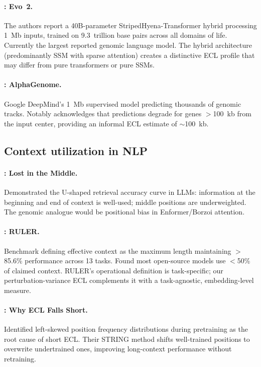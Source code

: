 \paragraph{\citet{Brixi2025Evo2}: Evo~2.}
The authors report a 40B-parameter StripedHyena-Transformer hybrid processing 1~Mb inputs, trained on 9.3~trillion base pairs across all domains of life. Currently the largest reported genomic language model. The hybrid architecture (predominantly SSM with sparse attention) creates a distinctive ECL profile that may differ from pure transformers or pure SSMs.

\paragraph{\citet{Benegas2026AlphaGenome}: AlphaGenome.}
Google DeepMind's 1~Mb supervised model predicting thousands of genomic tracks. Notably acknowledges that predictions degrade for genes $>$100~kb from the input center, providing an informal ECL estimate of $\sim$100~kb.

\subsection{Context utilization in NLP}

\paragraph{\citet{Liu2024LostInMiddle}: Lost in the Middle.}
Demonstrated the U-shaped retrieval accuracy curve in LLMs: information at the beginning and end of context is well-used; middle positions are underweighted. The genomic analogue would be positional bias in Enformer/Borzoi attention.

\paragraph{\citet{Hsieh2024RULER}: RULER.}
Benchmark defining effective context as the maximum length maintaining $>$85.6\% performance across 13 tasks. Found most open-source models use $<$50\% of claimed context. RULER's operational definition is task-specific; our perturbation-variance ECL complements it with a task-agnostic, embedding-level measure.

\paragraph{\citet{An2024EffCtx}: Why ECL Falls Short.}
Identified left-skewed position frequency distributions during pretraining as the root cause of short ECL. Their STRING method shifts well-trained positions to overwrite undertrained ones, improving long-context performance without retraining.

